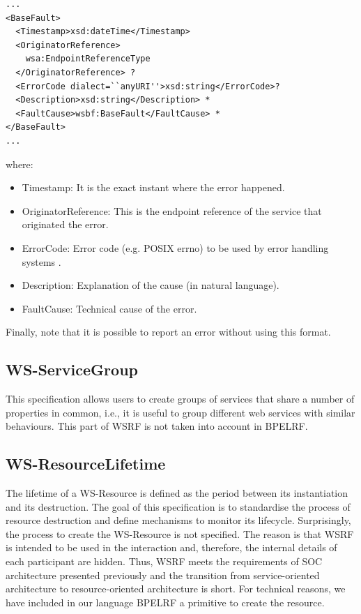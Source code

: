 \begin{lstlisting}
...
<BaseFault> 
  <Timestamp>xsd:dateTime</Timestamp> 
  <OriginatorReference> 
    wsa:EndpointReferenceType 
  </OriginatorReference> ? 
  <ErrorCode dialect=``anyURI''>xsd:string</ErrorCode>? 
  <Description>xsd:string</Description> * 
  <FaultCause>wsbf:BaseFault</FaultCause> * 
</BaseFault>
...
\end{lstlisting}
where:

\begin{itemize}
\item Timestamp: It is the exact instant where the error happened.
\item OriginatorReference: This is the endpoint reference of the service that originated the error.
\item ErrorCode: Error code (e.g. POSIX errno) to be used by error handling systems .
\item Description: Explanation of the cause (in natural language).
\item FaultCause: Technical cause of the error. 
\end{itemize}
Finally, note that it is possible to report an error without using this format. %
\subsection{WS-ServiceGroup}
This specification allows users to create groups of services 
that share a number of properties in common, i.e., it is useful to group different web services with similar behaviours.
This part of WSRF is not taken into account in BPELRF.

\subsection{WS-ResourceLifetime}
The lifetime of a WS-Resource is defined as the period between its instantiation and its destruction. 
The goal of this specification is to standardise the process of resource destruction
and define mechanisms to monitor its lifecycle. Surprisingly, the process to create the WS-Resource
is not specified. The reason is that WSRF is intended to be used in the interaction and, therefore, the 
internal details of each participant are hidden. Thus, WSRF meets the requirements of SOC
architecture presented previously and the transition from service-oriented architecture to resource-oriented
architecture is short. For technical reasons, we have included in our language
BPELRF a primitive to create the resource. 

